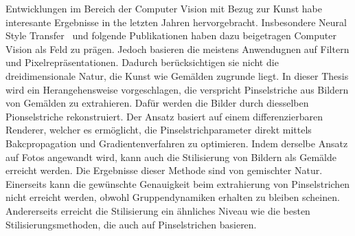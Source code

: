 Entwicklungen im Bereich der Computer Vision mit Bezug zur Kunst habe interesante Ergebnisse in the letzten Jahren hervorgebracht.
Insbesondere Neural Style Transfer~\cite{gatys} und folgende Publikationen haben dazu beigetragen Computer Vision als Feld zu prägen.
Jedoch basieren die meistens Anwendugnen auf Filtern und Pixelrepräsentationen.
Dadurch berücksichtigen sie nicht die dreidimensionale Natur, die Kunst wie Gemälden zugrunde liegt.
In dieser Thesis wird ein Herangehensweise vorgeschlagen, die verspricht Pinselstriche aus Bildern von Gemälden zu extrahieren.
Dafür werden die Bilder durch diesselben Pionselstriche rekonstruiert.
Der Ansatz basiert auf einem differenzierbaren Renderer, welcher es ermöglicht, die Pinselstrichparameter direkt mittels Bakcpropagation und Gradientenverfahren zu optimieren.
Indem derselbe Ansatz auf Fotos angewandt wird, kann auch die Stilisierung von Bildern als Gemälde erreicht werden.
Die Ergebnisse dieser Methode sind von gemischter Natur.
Einerseits kann die gewünschte Genauigkeit beim extrahierung von Pinselstrichen nicht erreicht werden, obwohl Gruppendynamiken erhalten zu bleiben scheinen.
Andererseits erreicht die Stilisierung ein ähnliches Niveau wie die besten Stilisierungsmethoden, die auch auf Pinselstrichen basieren.

